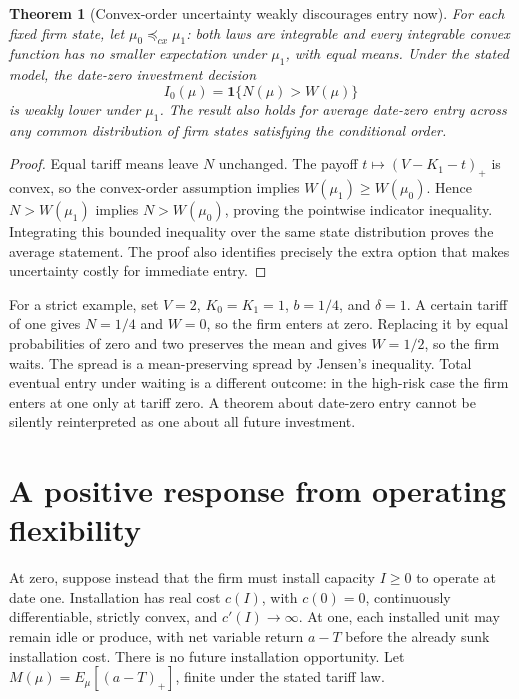 \documentclass[11pt]{article}
\newtheorem{theorem}{Theorem}
\theoremstyle{definition}
\begin{document}
\begin{theorem}[Convex-order uncertainty weakly discourages entry now]
For each fixed firm state, let $\mu_0\preceq_{cx}\mu_1$: both laws are integrable and every integrable convex function has no smaller expectation under $\mu_1$, with equal means. Under the stated model, the date-zero investment decision
\[
 I_0(\mu)=\mathbf1\{N(\mu)>W(\mu)\}
\]
is weakly lower under $\mu_1$. The result also holds for average date-zero entry across any common distribution of firm states satisfying the conditional order.
\end{theorem}
\begin{proof}
Equal tariff means leave $N$ unchanged. The payoff $t\mapsto(V-K_1-t)_+$ is convex, so the convex-order assumption implies $W(\mu_1)\ge W(\mu_0)$. Hence $N>W(\mu_1)$ implies $N>W(\mu_0)$, proving the pointwise indicator inequality. Integrating this bounded inequality over the same state distribution proves the average statement. The proof also identifies precisely the extra option that makes uncertainty costly for immediate entry.
\end{proof}

For a strict example, set $V=2$, $K_0=K_1=1$, $b=1/4$, and $\delta=1$. A certain tariff of one gives $N=1/4$ and $W=0$, so the firm enters at zero. Replacing it by equal probabilities of zero and two preserves the mean and gives $W=1/2$, so the firm waits. The spread is a mean-preserving spread by Jensen's inequality. Total eventual entry under waiting is a different outcome: in the high-risk case the firm enters at one only at tariff zero. A theorem about date-zero entry cannot be silently reinterpreted as one about all future investment.

\section*{A positive response from operating flexibility}
At zero, suppose instead that the firm must install capacity $I\ge0$ to operate at date one. Installation has real cost $c(I)$, with $c(0)=0$, continuously differentiable, strictly convex, and $c'(I)\to\infty$. At one, each installed unit may remain idle or produce, with net variable return $a-T$ before the already sunk installation cost. There is no future installation opportunity. Let $M(\mu)=E_\mu[(a-T)_+]$, finite under the stated tariff law.
\end{document}
